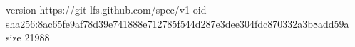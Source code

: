 version https://git-lfs.github.com/spec/v1
oid sha256:8ac65fe9af78d39e741888e712785f544d287e3dee304fdc870332a3b8add59a
size 21988
